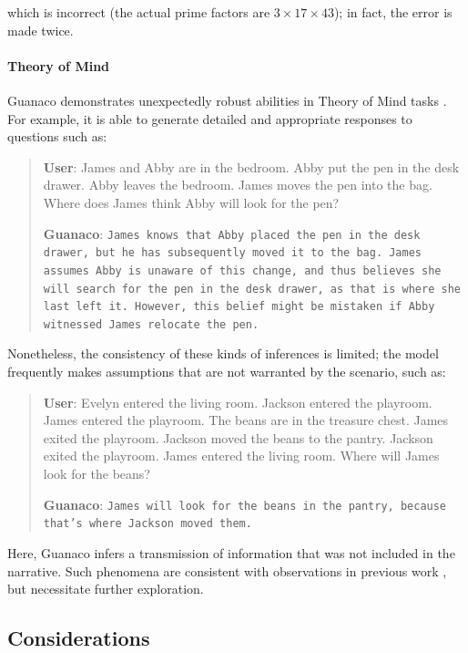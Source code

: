 which is incorrect (the actual prime factors are $3 \times 17 \times 43$); in fact, the error is made twice.

\paragraph{Theory of Mind} {Guanaco} demonstrates unexpectedly robust abilities in Theory of Mind tasks \cite{nematzadeh2018evaluating, sap2022neural}. For example, it is able to generate detailed and appropriate responses to questions such as:

\begin{quote}
    \textbf{User}: James and Abby are in the bedroom. Abby put the pen in the desk drawer. Abby leaves the bedroom. James moves the pen into the bag. Where does James think Abby will look for the pen?

    \textbf{Guanaco}: \texttt{James knows that Abby placed the pen in the desk drawer, but he has subsequently moved it to the bag. James assumes Abby is unaware of this change, and thus believes she will search for the pen in the desk drawer, as that is where she last left it. However, this belief might be mistaken if Abby witnessed James relocate the pen.}
\end{quote}

Nonetheless, the consistency of these kinds of inferences is limited; the model frequently makes assumptions that are not warranted by the scenario, such as:

\begin{quote}
    \textbf{User}: Evelyn entered the living room. Jackson entered the playroom. James entered the playroom. The beans are in the treasure chest. James exited the playroom. Jackson moved the beans to the pantry. Jackson exited the playroom. James entered the living room. Where will James look for the beans?

    \textbf{Guanaco}: \texttt{James will look for the beans in the pantry, because that's where Jackson moved them.}
\end{quote}

Here, {Guanaco} infers a transmission of information that was not included in the narrative. Such phenomena are consistent with observations in previous work \cite{sap2022neural}, but necessitate further exploration.

\subsection{Considerations}
\label{ssec:considerations}

